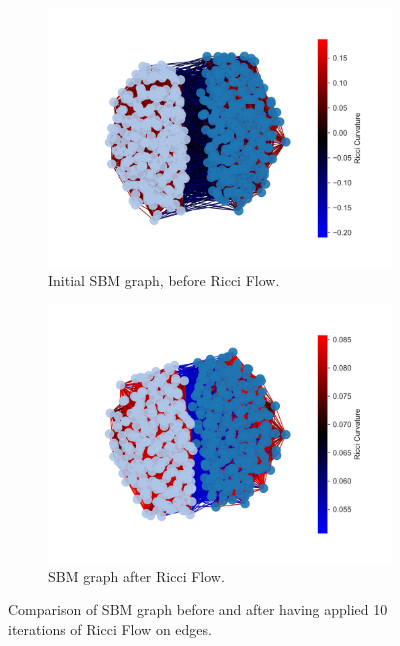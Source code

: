 \begin{figure}
    \centering
    \begin{subfigure}{0.45\textwidth}
        \centering
        \includegraphics[width=\textwidth]{../tests/ToyModelResults/SBM/Before Ricci Flow.png}
        \caption{Initial SBM graph, before Ricci Flow.}
    \end{subfigure}
    \hfill
    \begin{subfigure}{0.45\textwidth}
        \centering
        \includegraphics[width=\textwidth]{../tests/ToyModelResults/SBM/After Ricci Flow.png}
        \caption{SBM graph after Ricci Flow.}
    \end{subfigure}
    \caption{Comparison of SBM graph before and after having applied 10 iterations of Ricci Flow on edges.}
\end{figure}\label{fig:SBM_comparison}

